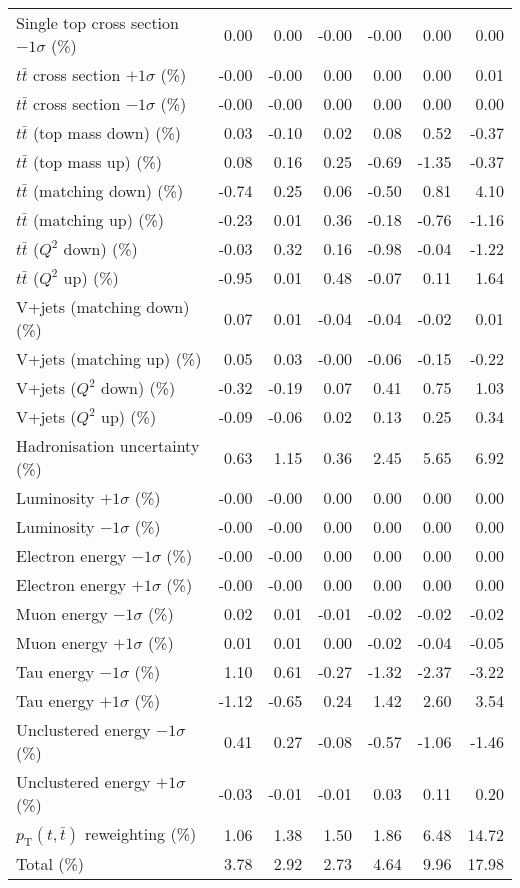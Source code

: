 \begin{table}[htbp]
{\begin{tabular}{lrrrrrr}
Single top cross section $-1\sigma$ (\%) & 0.00 & 0.00 & -0.00 & -0.00 & 0.00 & 0.00 \\ 
$t\bar{t}$ cross section $+1\sigma$ (\%) & -0.00 & -0.00 & 0.00 & 0.00 & 0.00 & 0.01 \\ 
$t\bar{t}$ cross section $-1\sigma$ (\%) & -0.00 & -0.00 & 0.00 & 0.00 & 0.00 & 0.00 \\ 
$t\bar{t}$ (top mass down) (\%) & 0.03 & -0.10 & 0.02 & 0.08 & 0.52 & -0.37 \\ 
$t\bar{t}$ (top mass up) (\%) & 0.08 & 0.16 & 0.25 & -0.69 & -1.35 & -0.37 \\ 
$t\bar{t}$ (matching down) (\%) & -0.74 & 0.25 & 0.06 & -0.50 & 0.81 & 4.10 \\ 
$t\bar{t}$ (matching up) (\%) & -0.23 & 0.01 & 0.36 & -0.18 & -0.76 & -1.16 \\ 
$t\bar{t}$ ($Q^{2}$ down) (\%) & -0.03 & 0.32 & 0.16 & -0.98 & -0.04 & -1.22 \\ 
$t\bar{t}$ ($Q^{2}$ up) (\%) & -0.95 & 0.01 & 0.48 & -0.07 & 0.11 & 1.64 \\ 
V+jets (matching down) (\%) & 0.07 & 0.01 & -0.04 & -0.04 & -0.02 & 0.01 \\ 
V+jets (matching up) (\%) & 0.05 & 0.03 & -0.00 & -0.06 & -0.15 & -0.22 \\ 
V+jets ($Q^{2}$ down) (\%) & -0.32 & -0.19 & 0.07 & 0.41 & 0.75 & 1.03 \\ 
V+jets ($Q^{2}$ up) (\%) & -0.09 & -0.06 & 0.02 & 0.13 & 0.25 & 0.34 \\ 
Hadronisation uncertainty (\%) & 0.63 & 1.15 & 0.36 & 2.45 & 5.65 & 6.92 \\ 
Luminosity $+1\sigma$ (\%) & -0.00 & -0.00 & 0.00 & 0.00 & 0.00 & 0.00 \\ 
Luminosity $-1\sigma$ (\%) & -0.00 & -0.00 & 0.00 & 0.00 & 0.00 & 0.00 \\ 
Electron energy $-1\sigma$ (\%) & -0.00 & -0.00 & 0.00 & 0.00 & 0.00 & 0.00 \\ 
Electron energy $+1\sigma$ (\%) & -0.00 & -0.00 & 0.00 & 0.00 & 0.00 & 0.00 \\ 
Muon energy $-1\sigma$ (\%) & 0.02 & 0.01 & -0.01 & -0.02 & -0.02 & -0.02 \\ 
Muon energy $+1\sigma$ (\%) & 0.01 & 0.01 & 0.00 & -0.02 & -0.04 & -0.05 \\ 
Tau energy $-1\sigma$ (\%) & 1.10 & 0.61 & -0.27 & -1.32 & -2.37 & -3.22 \\ 
Tau energy $+1\sigma$ (\%) & -1.12 & -0.65 & 0.24 & 1.42 & 2.60 & 3.54 \\ 
Unclustered energy $-1\sigma$ (\%) & 0.41 & 0.27 & -0.08 & -0.57 & -1.06 & -1.46 \\ 
Unclustered energy $+1\sigma$ (\%) & -0.03 & -0.01 & -0.01 & 0.03 & 0.11 & 0.20 \\ 
$p_\mathrm{T}(t,\bar{t})$ reweighting (\%) & 1.06 & 1.38 & 1.50 & 1.86 & 6.48 & 14.72 \\ 
\hline 
Total (\%) & 3.78  & 2.92  & 2.73  & 4.64  & 9.96  & 17.98 \\ 
\hline 
\end{tabular}
}
\end{table}
